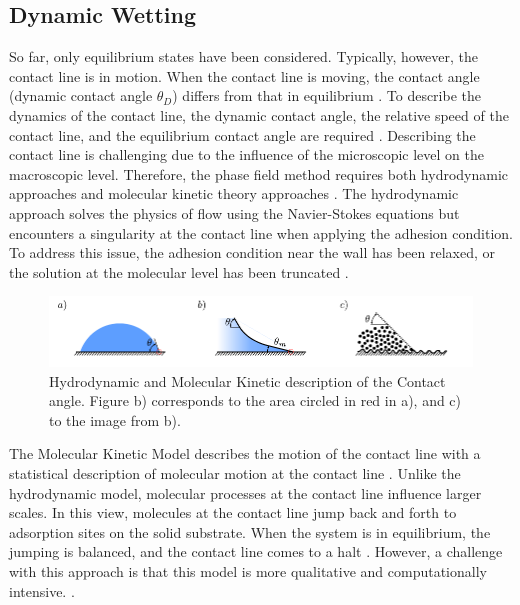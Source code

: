 \subsection{Dynamic Wetting}
So far, only equilibrium states have been considered. Typically, however, the contact line is in motion. When the contact line is moving, the contact angle (dynamic contact angle $\theta_D$) differs from that in equilibrium \cite{blake2006PhysicsMovingWetting}. To describe the dynamics of the contact line, the dynamic contact angle, the relative speed of the contact line, and the equilibrium contact angle are required \cite{mohammadkarim2022ReviewPhysicsMoving, blake2006PhysicsMovingWetting, cox1986DynamicsSpreadingLiquids, huh1971HydrodynamicModelSteady, voinovHydrodynamicsWetting1977}.
Describing the contact line is challenging due to the influence of the microscopic level on the macroscopic level. Therefore, the phase field method requires both hydrodynamic approaches and molecular kinetic theory approaches \cite{blake2006PhysicsMovingWetting, carlsonCapillarityDynamicWetting2012}.
The hydrodynamic approach solves the physics of flow using the Navier-Stokes equations but encounters a singularity at the contact line when applying the adhesion condition. To address this issue, the adhesion condition near the wall has been relaxed, or the solution at the molecular level has been truncated \cite{blake2006PhysicsMovingWetting}.
\begin{figure}[h]
    \centering
    \includegraphics[width=.95\textwidth]{Pictures/ContactAngles_HDT_MKT.pdf}
    \caption{Hydrodynamic and Molecular Kinetic description of the Contact angle. Figure b) corresponds to the area circled in red in a), and c) to the image from b).}
    \label{fig: HDT_MKT_comp}
\end{figure}
The Molecular Kinetic Model describes the motion of the contact line with a statistical description of molecular motion at the contact line \cite{blake1969KineticsDisplacement}. Unlike the hydrodynamic model, molecular processes at the contact line influence larger scales. In this view, molecules at the contact line jump back and forth to adsorption sites on the solid substrate. When the system is in equilibrium, the jumping is balanced, and the contact line comes to a halt \cite{car, blake2006PhysicsMovingWetting}. However, a challenge with this approach is that this model is more qualitative and computationally intensive. .

